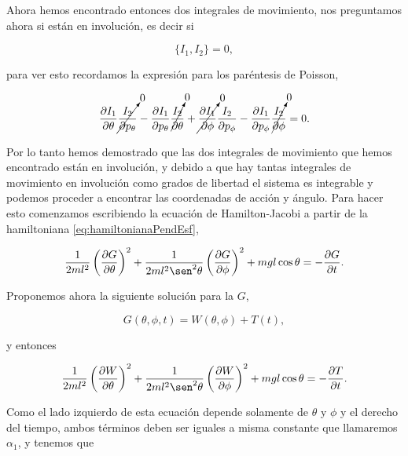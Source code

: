 \documentclass[a4paper,10pt]{article}
\numberwithin{equation}{section}
\begin{document}
Ahora hemos encontrado entonces dos integrales de movimiento, nos preguntamos ahora 
si están en involución, es decir si 

\begin{equation}
 \{I_1, I_2\} = 0,
\end{equation}

para ver esto recordamos la expresión para los paréntesis de Poisson, 

\begin{equation}
 \frac{\partial I_1}{\partial \theta}\cancelto{0}{\frac{I_2}{\partial p_\theta}} 
 - \frac{\partial I_1}{\partial p_\theta}\cancelto{0}{\frac{I_2}{\partial \theta}} + 
 \cancelto{0}{\frac{\partial I_1}{\partial \phi}}\frac{I_2}{\partial p_\phi} 
 - \frac{\partial I_1}{\partial p_\phi}\cancelto{0}{\frac{I_2}{\partial \phi}} = 
 0.
\end{equation}

Por lo tanto hemos demostrado que las dos integrales de movimiento que hemos encontrado 
están en involución, y debido a que hay tantas integrales de movimiento en involución como grados 
de libertad el sistema es integrable y podemos proceder a encontrar las coordenadas de 
acción y ángulo. Para hacer esto comenzamos escribiendo la ecuación de Hamilton-Jacobi 
a partir de la hamiltoniana \eqref{eq:hamiltonianaPendEsf}, 

\begin{equation}
 \frac{1}{2ml^2}\left(\frac{\partial G}{\partial \theta} \right)^2 
 + \frac{1}{2ml^2\sen^2{\theta}}\left(\frac{\partial G}{\partial \phi} \right)^2 
 + mgl\cos{\theta} = - \frac{\partial G}{\partial t}.
\end{equation}

Proponemos ahora la siguiente solución para la $G$, 

\begin{equation}
 G(\theta,\phi,t) = W(\theta,\phi) +  T(t),
\end{equation}

y entonces 

\begin{equation}
 \frac{1}{2ml^2}\left(\frac{\partial W}{\partial \theta} \right)^2 
 + \frac{1}{2ml^2\sen^2{\theta}}\left(\frac{\partial W}{\partial \phi} \right)^2 
 + mgl\cos{\theta} = - \frac{\partial T}{\partial t}.
\end{equation}

Como el lado izquierdo de esta ecuación depende solamente de $\theta$ y $\phi$ y el 
derecho del tiempo, ambos términos deben ser iguales a misma constante que llamaremos 
$\alpha_1$, y tenemos que 
\end{document}
